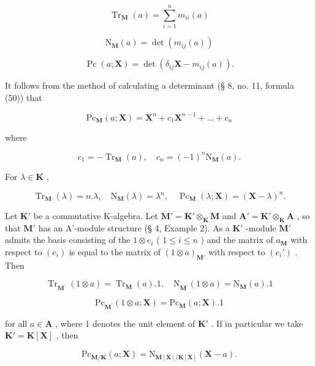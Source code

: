 \[
\operatorname{Tr} _ {\mathbf {M}} (a) = \sum_ {i = 1} ^ {n} m _ {i i} (a)\tag{5}
\]

\[
\mathrm{N} _ {\mathbf {M}} (a) = \det (m _ {i j} (a))\tag{6}
\]

\[
\operatorname{Pc} (a; \mathbf {X}) = \det (\delta_ {i j} \mathbf {X} - m _ {i j} (a)).
\]

It follows from the method of calculating a determinant (§ 8, no. 11, formula (50)) that

\[
\mathrm{Pc} _ {\mathbf {M}} (a; \mathbf {X}) = \mathbf {X} ^ {n} + c _ {1} \mathbf {X} ^ {n - 1} + \dots + c _ {n}\tag{7}
\]

where

\[
c _ {1} = - \operatorname{Tr} _ {\mathbf {M}} (a), \quad c _ {n} = (- 1) ^ {n} \mathrm{N} _ {\mathbf {M}} (a).\tag{8}
\]

For \(\lambda \in \mathbf{K}\) ,

\[
\operatorname{Tr} _ {\mathbf {M}} (\lambda) = n. \lambda , \quad \mathrm{N} _ {\mathbf {M}} (\lambda) = \lambda^ {n}, \quad \operatorname{Pc} _ {\mathbf {M}} (\lambda ; \mathbf {X}) = (\mathbf {X} - \lambda) ^ {n}.\tag{9}
\]

Let \(\mathbf{K}'\) be a commutative K-algebra. Let \(\mathbf{M}' = \mathbf{K}' \otimes_{\mathbf{K}} \mathbf{M}\) and \(\mathbf{A}' = \mathbf{K}' \otimes_{\mathbf{K}} \mathbf{A}\) , so that \(\mathbf{M}'\) has an A'-module structure (§ 4, Example 2). As a \(\mathbf{K}'\) -module \(\mathbf{M}'\) admits the basis consisting of the \(1 \otimes e_i\) ( \(1 \leqslant i \leqslant n\) ) and the matrix of \(a_{\mathbf{M}}\) with respect to \((e_i)\) is equal to the matrix of \((1 \otimes a)_{\mathbf{M}'}\) with respect to \((e_i')\) . Then

\[
\operatorname{Tr} _ {\mathbf {M} ^ {\prime}} (1 \otimes a) = \operatorname{Tr} _ {\mathbf {M}} (a). 1, \quad \mathrm{N} _ {\mathbf {M} ^ {\prime}} (1 \otimes a) = \mathrm{N} _ {\mathbf {M}} (a). 1\tag{12}
\]

\[
\mathrm{Pc} _ {\mathbf {M} ^ {\prime}} (1 \otimes a; \mathbf {X}) = \mathrm{Pc} _ {\mathbf {M}} (a; \mathbf {X}). 1
\]

for all \(a \in \mathbf{A}\) , where 1 denotes the unit element of \(\mathbf{K}'\) . If in particular we take \(\mathbf{K}' = \mathbf{K}[\mathbf{X}]\) , then

\[
\mathrm{Pc} _ {\mathbf {M} / \mathbf {K}} (a; \mathbf {X}) = \mathrm{N} _ {\mathbf {M} [ \mathbf {X} ] / \mathbf {K} [ \mathbf {X} ]} (\mathbf {X} - a).\tag{13}
\]


